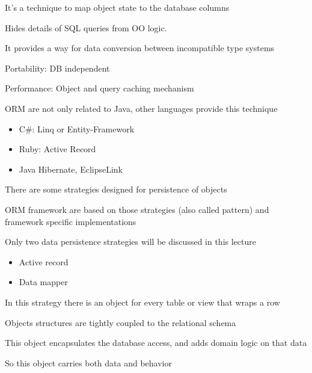 \documentclass{beamer}
\begin{document}
\begin{slide}{
\item It's a technique to map object state to the database columns
\pause
\item Hides details of SQL queries from OO logic.
\pause 
\item It provides a way for data conversion between incompatible type systems 
\pause 
\item Portability: DB independent
\pause 
\item Performance: Object and query caching mechanism  
\pause 
\item ORM are not only related to Java, other languages provide this technique
\begin{itemize}
\item C\#: Linq or Entity-Framework
\item Ruby: Active Record
\item Java Hibernate, EclipseLink
\end{itemize}
}
\end{slide}


\begin{slide}{
\item There are some strategies designed for persistence of objects
\item ORM framework are based on those strategies (also called pattern) and framework specific implementations
\item Only two data persistence strategies will be discussed in this lecture
\pause 
\begin{itemize}
\item Active record
\item Data mapper 
\end{itemize}
}\end{slide}

\begin{slide}{
\item In this strategy there is an object for every table or view that wraps a row
\pause
\item Objects structures are tightly coupled to the relational schema
\pause
\item This object encapsulates the database access, and adds domain logic on that data
\pause
\item So this object carries both data and behavior 

}\end{slide}
\end{document}
